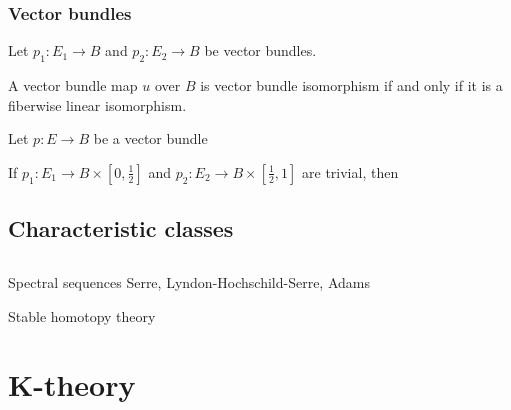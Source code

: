 \documentclass{../../large}
\begin{document}
\section{Vector bundles}
\begin{prb}

\end{prb}

\begin{prb}
Let $p_1:E_1\to B$ and $p_2:E_2\to B$ be vector bundles.
\begin{parts}
\item A vector bundle map $u$ over $B$ is vector bundle isomorphism if and only if it is a fiberwise linear isomorphism.
\end{parts}
\end{prb}

\begin{prb}
\end{prb}

\begin{prb}
Let $p:E\to B$ be a vector bundle

If $p_1:E_1\to B\times[0,\frac12]$ and $p_2:E_2\to B\times[\frac12,1]$ are trivial, then 
\begin{parts}
\item 
\end{parts}
\end{prb}

\begin{prb}
\end{prb}



\chapter{Characteristic classes}


\chapter{}
Spectral sequences
	Serre,
	Lyndon-Hochschild-Serre,
	Adams

Stable homotopy theory



\part{K-theory}
\end{document}
